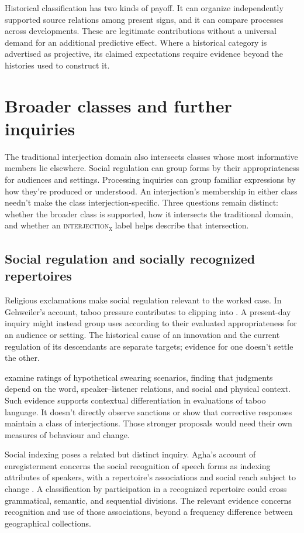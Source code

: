 \documentclass[12pt]{article}
\newcommand{\intj}[1]{\textsc{interjection\textsubscript{#1}}}
\begin{document}
Historical classification has two kinds of payoff. It can
organize independently supported source relations among present signs,
and it can compare processes across developments. These are legitimate
contributions without a universal demand for an additional predictive
effect. Where a historical category is advertised as projective,
its claimed expectations require evidence beyond the histories used
to construct it.

\section{Broader classes and further inquiries}\label{sec:extensions}

The traditional interjection domain also intersects classes whose most
informative members lie elsewhere. Social regulation can group forms
by their appropriateness for audiences and settings. Processing inquiries
can group familiar expressions by how they're produced or understood.
An interjection's membership in either class needn't make the class
interjection-specific. Three questions remain distinct: whether the
broader class is supported, how it intersects the traditional domain,
and whether an \intj{x} label helps describe that intersection.

\subsection{Social regulation and socially recognized repertoires}

Religious exclamations make social regulation relevant to the worked
case. In Gehweiler's account, taboo pressure contributes to clipping
 into . A present-day inquiry might instead
group uses according to their evaluated appropriateness for an audience
or setting. The historical cause of an innovation and the current
regulation of its descendants are separate targets; evidence for one
doesn't settle the other.

\textcite{jayjanschewitz2008} examine ratings of hypothetical swearing scenarios,
finding that judgments depend on the word, speaker--listener relations,
and social and physical context. Such evidence
supports contextual differentiation in evaluations of taboo language.
It doesn't directly observe sanctions or show that corrective responses
maintain a class of interjections. Those stronger proposals would need
their own measures of behaviour and change.

Social indexing poses a related but distinct inquiry. Agha's account
of enregisterment concerns the social recognition of speech forms as
indexing attributes of speakers, with a repertoire's associations and
social reach subject to change \citep[38--40]{agha2005}. A classification
by participation in a recognized repertoire could cross grammatical,
semantic, and sequential divisions. The relevant evidence concerns
recognition and use of those associations, beyond a frequency difference
between geographical collections.
\end{document}
